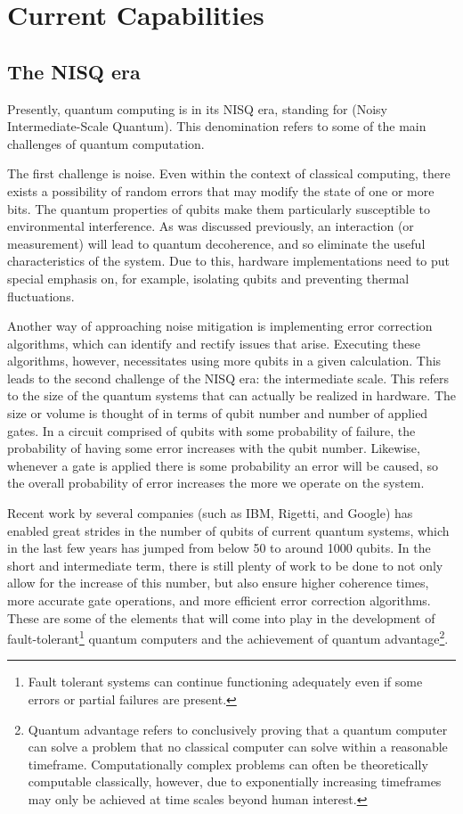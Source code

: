 \section{Current Capabilities}

\subsection{The NISQ era}
Presently, quantum computing is in its NISQ era, standing for (Noisy Intermediate-Scale Quantum). This denomination refers to some of the main challenges of quantum computation. 

The first challenge is noise. Even within the context of classical computing, there exists a possibility of random errors that may modify the state of one or more bits. The quantum properties of qubits make them particularly susceptible to environmental interference. As was discussed previously, an interaction (or measurement) will lead to quantum decoherence, and so eliminate the useful characteristics of the system. Due to this, hardware implementations need to put special emphasis on, for example, isolating qubits and preventing thermal fluctuations. 

Another way of approaching noise mitigation is implementing error correction algorithms, which can identify and rectify issues that arise. Executing these algorithms, however, necessitates using more qubits in a given calculation. This leads to the second challenge of the NISQ era: the intermediate scale. This refers to the size of the quantum systems that can actually be realized in hardware. The size or volume is thought of in terms of qubit number and number of applied gates. In a circuit comprised of qubits with some probability of failure, the probability of having some error increases with the qubit number. Likewise, whenever a gate is applied there is some probability an error will be caused, so the overall probability of error increases the more we operate on the system.

Recent work by several companies (such as IBM, Rigetti, and Google) has enabled great strides in the number of qubits of current quantum systems, which in the last few years has jumped from below 50 to around 1000 qubits. In the short and intermediate term, there is still plenty of work to be done to not only allow for the increase of this number, but also ensure higher coherence times, more accurate gate operations, and more efficient error correction algorithms. These are some of the elements that will come into play in the development of fault-tolerant\footnote{Fault tolerant systems can continue functioning adequately even if some errors or partial failures are present.} quantum computers and the achievement of quantum advantage\footnote{Quantum advantage refers to conclusively proving that a quantum computer can solve a problem that no classical computer can solve within a reasonable timeframe. Computationally complex problems can often be theoretically computable classically, however, due to exponentially increasing timeframes may only be achieved at time scales beyond human interest.}.

